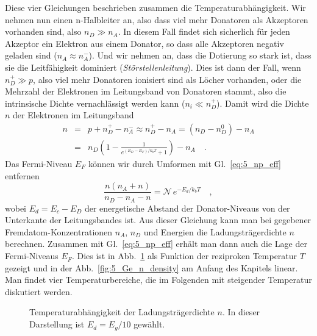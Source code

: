 Diese vier Gleichungen beschrieben zusammen die Temperaturabhängigkeit. Wir nehmen nun  einen n-Halbleiter an, also dass viel mehr Donatoren als Akzeptoren vorhanden sind, also $n_D \gg n_A$. In diesem Fall findet sich sicherlich für jeden Akzeptor ein Elektron aus einem Donator, so dass alle Akzeptoren negativ geladen sind ($n_A \approx n_A^-$).
Und wir nehmen an, dass die Dotierung so stark ist, dass sie die Leitfähigkeit dominiert (\emph{Störstellenleitung}). Dies ist dann der Fall, wenn $n_D^+ \gg p$, also viel mehr Donatoren ionisiert sind als Löcher vorhanden, oder die Mehrzahl der Elektronen im Leitungsband von Donatoren stammt, also die intrinsische Dichte vernachlässigt werden kann ($n_i \ll n_D^+$). Damit wird die Dichte $n$ der Elektronen im Leitungsband
\begin{eqnarray}
    n  &= & p + n_D^+ -  n_A^- \approx n_D^+ -  n_A = (n_D - n_D^0) - n_A \\
    & =& n_D \left( 1- \frac{1}{e^{(E_D - E_F)/ k_b T } +1} \right) - n_A \quad .
\end{eqnarray}
Das Fermi-Niveau $E_F$ können wir durch Umformen mit Gl.~\ref{eq:5_np_eff} entfernen
\begin{equation}
    \frac{n (n_A + n)}{n_D - n_A - n} = \mathcal{N} \, e^{- E_d / k_b T} \quad , \label{eq:5_n_of_T}
\end{equation}
wobei $E_d = E_c - E_D$ der energetische Abstand der Donator-Niveaus von der Unterkante der Leitungsbandes ist. Aus dieser Gleichung kann man bei gegebener Fremdatom-Konzentrationen  $n_A$, $n_D$ und Energien die Ladungsträgerdichte $n$ berechnen. Zusammen mit  
Gl.~\ref{eq:5_np_eff} erhält man dann auch die Lage der Fermi-Niveaus $E_F$. Dies ist in Abb.~\ref{fig:5_dpoing_temp} als Funktion der reziproken Temperatur $T$ gezeigt und in der Abb.~\ref{fig:5_Ge_n_density} am Anfang des Kapitels linear. Man findet vier Temperaturbereiche, die im Folgenden mit steigender Temperatur diskutiert werden.

\begin{figure} 
    \caption{Temperaturabhängigkeit der Ladungsträgerdichte $n$. In dieser Darstellung ist $E_d = E_g / 10$ gewählt. \label{fig:5_dpoing_temp}}
\end{figure}

